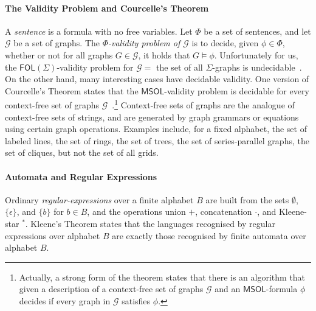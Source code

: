 \documentclass{aamas2015}
\def\gclass{\mathcal{G}}
\def\fol{\mathsf{FOL}}
\def\msol{\mathsf{MSOL}}
\def\fotc{\mathsf{FOL+TC}}
\newcommand{\sr}[1]{\footnote{{\color{red} Note. #1}}}
\begin{document}
\paragraph{The Validity Problem and Courcelle's Theorem}
A {\em sentence} is a formula with no free variables. Let $\Phi$ be a set of sentences, and let $\gclass$ be a set of graphs. The {\em $\Phi$-validity problem of $\gclass$} is to decide, given $\phi \in \Phi$, whether or not for all graphs $G \in \gclass$, it holds that $G \models \phi$. Unfortunately for us, the $\fol(\Sigma)$-validity problem for $\gclass = $ the set of all $\Sigma$-graphs is undecidable~\cite{EbFl95}. On the other hand, many interesting cases have decidable validity. One version of Courcelle's Theorem states that the $\msol$-validity problem is decidable for every context-free set of graphs $\gclass$~\cite{CE12}.\footnote{Actually, a strong form of the theorem states that there is an algorithm that given a description of a context-free set of graphs $\gclass$  and an $\msol$-formula $\phi$ decides if every graph in $\gclass$ satisfies $\phi$.} Context-free sets of graphs are the analogue of context-free sets of strings, and are generated by graph grammars or equations using certain graph operations. 
Examples include, for a fixed alphabet, the set of labeled lines, the set of rings, the set of trees, the set of series-parallel graphs, the set of cliques, but not the set of all grids. 

\paragraph{Automata and Regular Expressions}
%
Ordinary {\em regular-expressions} over a finite alphabet $B$ are built from the sets $\emptyset$, $\{\epsilon\}$, and $\{b\}$ for $b \in B$, and the operations union $+$, concatenation $\cdot$, and Kleene-star $\phantom{}^*$. 
Kleene's Theorem states that the languages recognised by regular expressions over alphabet $B$ are exactly those recognised by finite automata over alphabet $B$.
\end{document}
